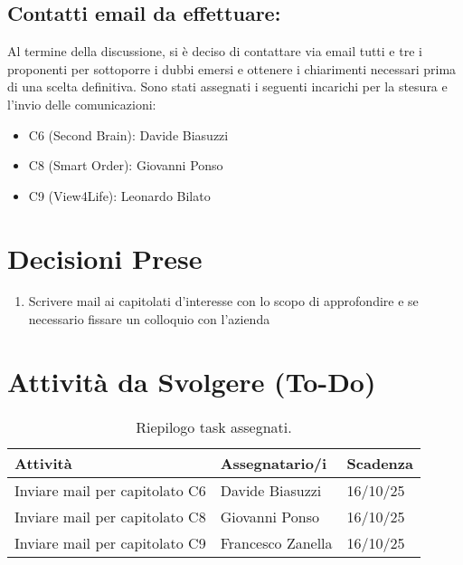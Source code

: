 \documentclass[a4paper, 11pt, oneside]{scrartcl} %
\begin{document}
\subsection{Contatti email da effettuare:}
Al termine della discussione, si è deciso di contattare via email tutti e tre i proponenti per sottoporre i dubbi emersi e ottenere i chiarimenti necessari prima di una scelta definitiva.
Sono stati assegnati i seguenti incarichi per la stesura e l'invio delle comunicazioni:

\begin{itemize}
    \item C6 (Second Brain): Davide Biasuzzi
    \item C8 (Smart Order): Giovanni Ponso
    \item C9 (View4Life): Leonardo Bilato
\end{itemize}
\newpage
\section{Decisioni Prese}

\begin{enumerate}
    \item Scrivere mail ai capitolati d'interesse con lo scopo di approfondire e se necessario fissare un colloquio con l'azienda
\end{enumerate}

\newpage
\section{Attività da Svolgere (To-Do)}

\begin{table}[h!]
\centering
\begin{tabular}{@{}lll@{}}
\toprule
\textbf{Attività} & \textbf{Assegnatario/i} & \textbf{Scadenza} \\
\midrule
Inviare mail per capitolato C6 & Davide Biasuzzi & 16/10/25 \\
Inviare mail per capitolato C8 & Giovanni Ponso & 16/10/25 \\
Inviare mail per capitolato C9 & Francesco Zanella & 16/10/25 \\
\bottomrule
\end{tabular}
\caption{Riepilogo task assegnati.}
\end{table}
\end{document}
